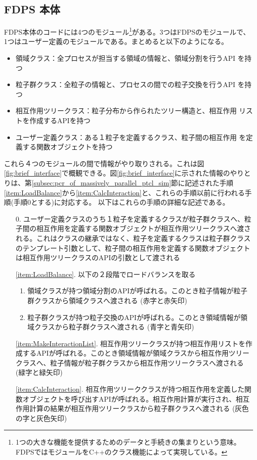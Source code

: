\subsection{FDPS 本体}
FDPS本体のコードには4つのモジュール\footnote{1つの大きな機能を提供するためのデータと手続きの集まりという意味。FDPSではモジュールをC++のクラス機能によって実現している。}がある。3つはFDPSのモジュールで、1つはユーザー定義のモジュールである。まとめると以下のようになる。
\begin{itemize}
\item 領域クラス：全プロセスが担当する領域の情報と、領域分割を行うAPI
  を持つ
\item 粒子群クラス：全粒子の情報と、プロセスの間での粒子交換を行うAPI
  を持つ
\item 相互作用ツリークラス：粒子分布から作られたツリー構造と、相互作用
  リストを作成するAPIを持つ
\item ユーザー定義クラス：ある１粒子を定義するクラス、粒子間の相互作用
  を定義する関数オブジェクトを持つ
\end{itemize}

これら４つのモジュールの間で情報がやり取りされる。これは図\ref{fig:brief_interface}で概観できる。図\ref{fig:brief_interface}に示された情報のやりとりは、第\ref{subsec:pcr_of_massively_parallel_ptcl_sim}節に記述された手順\ref{item:LoadBalance}から\ref{item:CalcInteraction}と、これらの手順以前に行われる手順(手順0とする)に対応する。
以下はこれらの手順の詳細な記述である。
\begin{enumerate}
\item[0.] ユーザー定義クラスのうち１粒子を定義するクラスが粒子群クラスへ、粒子間の相互作用を定義する関数オブジェクトが相互作用ツリークラスへ渡される。これはクラスの継承ではなく、粒子を定義するクラスは粒子群クラスのテンプレート引数として、粒子間の相互作用を定義する関数オブジェクトは相互作用ツリークラスのAPIの引数として渡される
\item[\ref{item:LoadBalance}.] 以下の２段階でロードバランスを取る
  \begin{enumerate}
  \item 領域クラスが持つ領域分割のAPIが呼ばれる。このとき粒子情報が粒子群クラスから領域クラスへ渡される (赤字と赤矢印)
  \item 粒子群クラスが持つ粒子交換のAPIが呼ばれる。このとき領域情報が領域クラスから粒子群クラスへ渡される (青字と青矢印)
  \end{enumerate}
\item[\ref{item:MakeInteractionList}.] 相互作用ツリークラスが持つ相互作用リストを作成するAPIが呼ばれる。このとき領域情報が領域クラスから相互作用ツリークラスへ、粒子情報が粒子群クラスから相互作用ツリークラスへ渡される (緑字と緑矢印)
\item[\ref{item:CalcInteraction}.] 相互作用ツリーククラスが持つ相互作用を定義した関数オブジェクトを呼び出すAPIが呼ばれる。相互作用計算が実行され、相互作用計算の結果が相互作用ツリークラスから粒子群クラスへ渡される (灰色の字と灰色矢印)
\end{enumerate}

